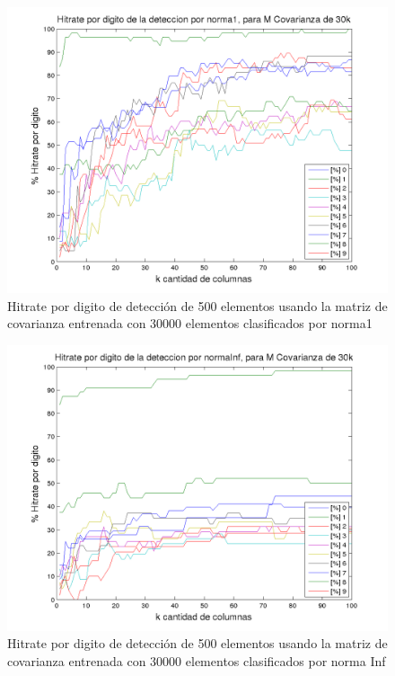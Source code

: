 \begin{figure}[H]
\begin {center}
\includegraphics[width=500pt]{plots/porDig-30kcv-norma1.png}
\end {center}
\caption{Hitrate por digito de detecci\'on de 500 elementos usando la matriz de covarianza entrenada con 30000 elementos
clasificados por norma1}
\label{fig:HRD30kcv-n1}
\end{figure}

\begin{figure}[H]
\begin {center}
\includegraphics[width=500pt]{plots/porDig-30kcv-normaInf.png}
\end {center}
\caption{Hitrate por digito de detecci\'on de 500 elementos usando la matriz de covarianza entrenada con 30000 elementos
clasificados por norma Inf}
\label{fig:HRD30kcv-ninf}
\end{figure}

